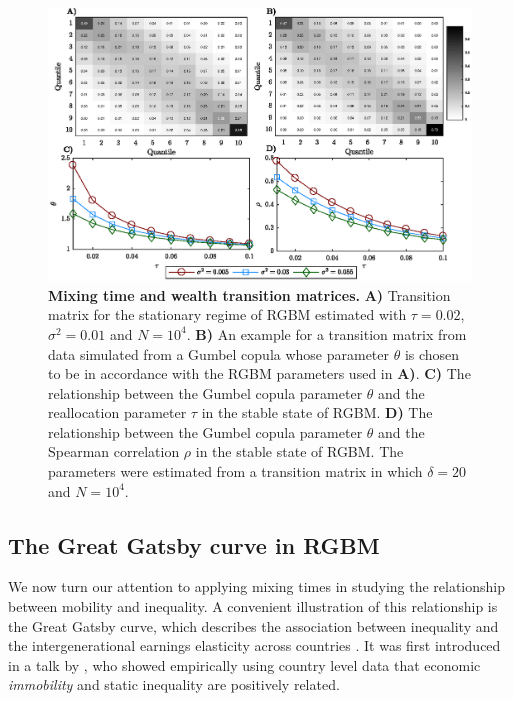 \documentclass[11pt]{article}
\numberwithin{equation}{section}
\begin{document}
\begin{figure}[!htb]
\centering
\includegraphics[width=1.0\textwidth]{figs/fig_rgbm_gumbel_v2.eps}
\caption{\textbf{Mixing time and wealth transition matrices.} \textbf{A)} Transition matrix for the stationary regime of RGBM estimated with $\tau = 0.02$, $\sigma^2 = 0.01$ and $N = 10^4$. \textbf{B)} An example for a transition matrix from data simulated from a Gumbel copula whose parameter $\theta$ is chosen to be in accordance with the RGBM parameters used in \textbf{A)}. \textbf{C)} The relationship between the Gumbel copula parameter $\theta$ and the reallocation parameter $\tau$ in the stable state of RGBM. \textbf{D)} The relationship between the Gumbel copula parameter $\theta$ and the Spearman correlation $\rho$ in the stable state of RGBM. The parameters were estimated from a transition matrix in which $\delta = 20$ and $N = 10^4$. %
\label{fig:rgbm-wealth-matrices}}
\end{figure}
\FloatBarrier

\subsection{The Great Gatsby curve in RGBM}

We now turn our attention to applying mixing times in studying the relationship between mobility and inequality. A convenient illustration of this relationship is the Great Gatsby curve, which describes the association between inequality and the intergenerational earnings elasticity across countries \citep{krueger2012,corak2013}. It was first introduced in a talk by \citet{krueger2012}, who showed empirically using country level data that economic \textit{immobility} and static inequality are positively related.
\end{document}

